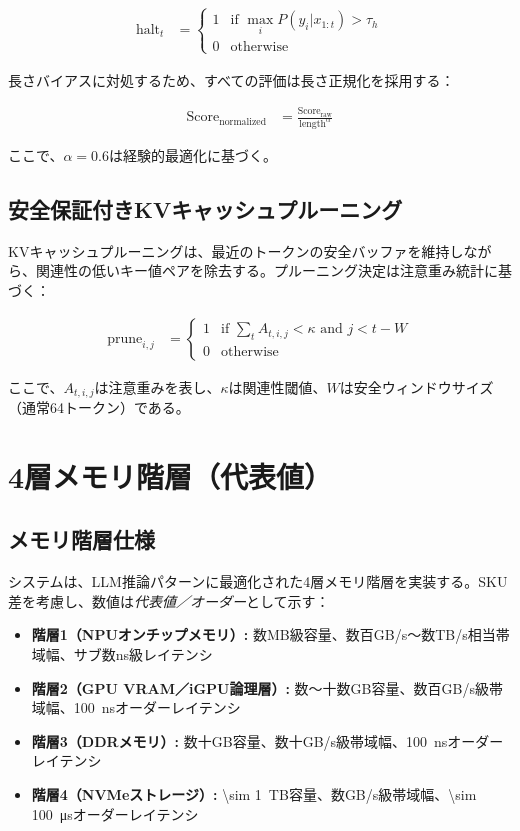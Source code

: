 \documentclass[10pt,twocolumn,a4paper]{jarticle}
\begin{document}
\begin{align}
\text{halt}_t &= \begin{cases}
1 & \text{if } \max_i P(y_i | x_{1:t}) > \tau_h \\
0 & \text{otherwise}
\end{cases} \label{eq:token_halt}
\end{align}

長さバイアスに対処するため、すべての評価は長さ正規化を採用する：

\begin{align}
\text{Score}_{\text{normalized}} &= \frac{\text{Score}_{\text{raw}}}{\text{length}^{\alpha}} \label{eq:length_norm}
\end{align}

ここで、$\alpha = 0.6$は経験的最適化に基づく。

\subsection{安全保証付きKVキャッシュプルーニング}

KVキャッシュプルーニングは、最近のトークンの安全バッファを維持しながら、関連性の低いキー値ペアを除去する。プルーニング決定は注意重み統計に基づく：

\begin{align}
\text{prune}_{i,j} &= \begin{cases}
1 & \text{if } \sum_{t} A_{t,i,j} < \kappa \text{ and } j < t - W \\
0 & \text{otherwise}
\end{cases} \label{eq:kv_prune}
\end{align}

ここで、$A_{t,i,j}$は注意重みを表し、$\kappa$は関連性閾値、$W$は安全ウィンドウサイズ（通常64トークン）である。

\section{4層メモリ階層（代表値）}

\subsection{メモリ階層仕様}

システムは、LLM推論パターンに最適化された4層メモリ階層を実装する。SKU差を考慮し、数値は\emph{代表値／オーダー}として示す：

\begin{itemize}
\item \textbf{階層1（NPUオンチップメモリ）:} 数MB級容量、数百GB/s～数TB/s相当帯域幅、サブ数ns級レイテンシ
\item \textbf{階層2（GPU VRAM／iGPU論理層）:} 数～十数GB容量、数百GB/s級帯域幅、\SI{100}{ns}オーダーレイテンシ  
\item \textbf{階層3（DDRメモリ）:} 数十GB容量、数十GB/s級帯域幅、\SI{100}{ns}オーダーレイテンシ
\item \textbf{階層4（NVMeストレージ）:} \SI{\sim 1}{TB}容量、数GB/s級帯域幅、\SI{\sim 100}{\micro s}オーダーレイテンシ
\end{itemize}
\end{document}
